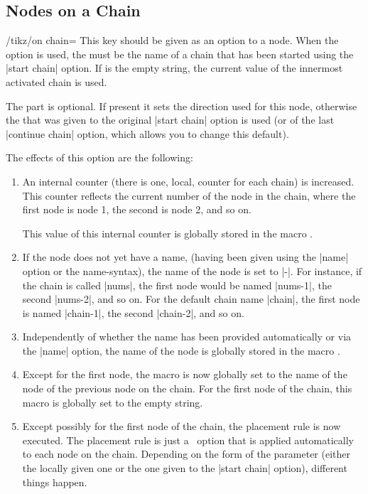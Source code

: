 \subsection{Nodes on a Chain}

\begin{key}{/tikz/on chain=}
  This key should be given as an option to a node. When the option is
  used, the  must be the name of a chain that has
  been started using the |start chain| option. If  is
  the empty string, the current value of the innermost activated chain
  is used. 

  The  part is optional. If present it sets the
  direction used for this node, otherwise the 
  that was given to the original |start chain| option is used (or of
  the last |continue chain| option, which allows you to change this
  default). 

  The effects of this option are the following:
  \begin{enumerate}
  \item An internal counter (there is one, local, counter
    for each chain) is increased. This counter reflects the current
    number of the node in the chain, where the first node is node 1,
    the second is node 2, and so on.

    This value of this internal counter is globally stored in the
    macro \declare{|\tikzchaincount|}.
  \item If the node does not yet have a name, (having been given using
    the |name| option or the name-syntax), the name of the node is set to
    |-|. For instance, if the chain is called |nums|, the first
    node would be named |nums-1|, the second |nums-2|, and so on. For
    the default chain name |chain|, the first node is named |chain-1|,
    the second |chain-2|, and so on.
  \item Independently of whether the name has been provided
    automatically or via the |name| option, the name of the node is
    globally stored in the macro \declare{|\tikzchaincurrent|}.
  \item Except for the first node, the macro
    \declare{|\tikzchainprevious|} is now globally set to the name of
    the node of the previous node on the chain. For the first node of
    the chain, this macro is globally set to the empty string.
  \item Except possibly for the first node of the chain, the placement
    rule is now executed. The placement rule is just a \tikzname\ option
    that is applied automatically to each node on the chain. Depending
    on the form of the  parameter (either the locally
    given one or the one given to the |start chain| option), different
    things happen.


\end{enumerate}
\end{key}
